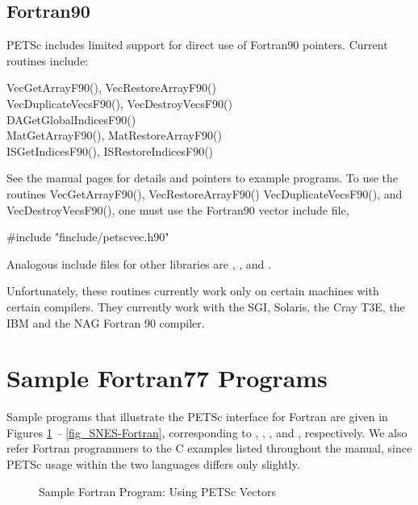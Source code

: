 \subsection{Fortran90}

PETSc includes limited support for direct use of Fortran90 pointers.
Current routines include:
\begin{tabbing}
 VecGetArrayF90(), VecRestoreArrayF90()\\
 VecDuplicateVecsF90(), VecDestroyVecsF90()\\
 DAGetGlobalIndicesF90()\\
 MatGetArrayF90(), MatRestoreArrayF90()\\
 ISGetIndicesF90(), ISRestoreIndicesF90()
\end{tabbing}
See the manual pages for details and pointers to example programs.  To
use the routines VecGetArrayF90(), VecRestoreArrayF90()
VecDuplicateVecsF90(), and VecDestroyVecsF90(), one must
use the Fortran90 vector include file,
\begin{tabbing}
    \#include "finclude/petscvec.h90"
\end{tabbing}
Analogous include files for other libraries are ,
, and .

Unfortunately, these routines currently work only on certain machines with 
certain compilers. They currently work with the SGI, Solaris, the Cray T3E, the
IBM and the NAG Fortran 90 compiler.

\section{Sample Fortran77 Programs}
\label{sec_fortran-examples}

Sample programs that illustrate the PETSc interface for Fortran
are given in Figures \ref{fig_vec-Fortran} {\em --} \ref{fig_SNES-Fortran},
corresponding to
, 
, 
\break {}, and 
, respectively.  We also
refer Fortran programmers to the C examples listed throughout the manual,
since PETSc usage within the two languages differs only slightly.

\begin{figure}[H]
{\small
{}
}
\caption{Sample Fortran Program:  Using PETSc Vectors}
\label{fig_vec-Fortran}
\end{figure}

